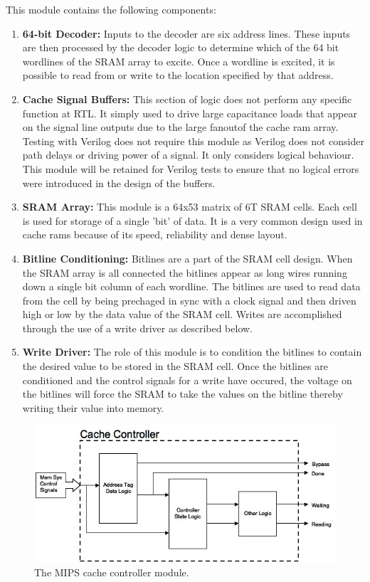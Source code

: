 This module contains the following components:
\begin{enumerate}
\item \textbf{64-bit Decoder: }Inputs to the decoder are six address lines. These inputs are then processed by the decoder logic to determine which of the 64 bit wordlines of the SRAM array to excite. Once a wordline is excited, it is possible to read from or write to the location specified by that address.
\item \textbf{Cache Signal Buffers: }This section of logic does not perform any specific function at RTL. It simply used to drive large capacitance loads that appear on the signal line outputs due to the large fanoutof the cache ram array. Testing with Verilog does not require this module as Verilog does not consider path delays or driving power of a signal. It only considers logical behaviour. This module will be retained for Verilog tests to ensure that no logical errors were introduced in the design of the buffers.
\item \textbf{SRAM Array: }This module is a 64x53 matrix of 6T SRAM cells. Each cell is used for storage of a single 'bit' of data. It is a very common design used in cache rams because of its speed, reliability and dense layout.
\item \textbf{Bitline Conditioning: }Bitlines are a part of the SRAM cell design. When the SRAM array is all connected the bitlines appear as long wires running down a single bit column of each wordline. The bitlines are used to read data from the cell by being prechaged in sync with a clock signal and then driven high or low by the data value of the SRAM cell. Writes are accomplished through the use of a write driver as described below.
\item \textbf{Write Driver: }The role of this module is to condition the bitlines to contain the desired value to be stored in the SRAM cell. Once the bitlines are conditioned and the control signals for a write have occured, the voltage on the bitlines will force the SRAM to take the values on the bitline thereby writing their value into memory.
\end{enumerate}

\begin{figure}
\centering 
\includegraphics[width=\textwidth]{cachecontroller.jpg}
\caption{The MIPS cache controller module.}
\label{cachecontroller}
\end{figure}

